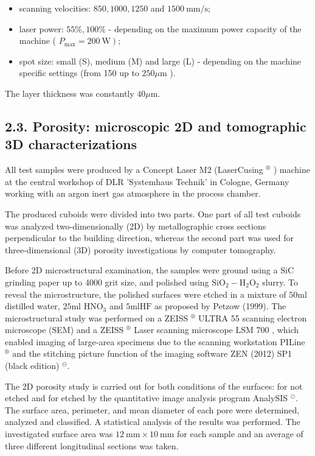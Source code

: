 \documentclass[10pt]{article}
\begin{document}
\begin{itemize}
  \item scanning velocities: $850,1000,1250$ and $1500 \mathrm{~mm} / \mathrm{s}$;

  \item laser power: $55 \%, 100 \%$ - depending on the maximum power capacity of the machine ( $\left.P_{\max }=200 \mathrm{~W}\right)$;

  \item spot size: small (S), medium (M) and large (L) - depending on the machine specific settings (from 150 up to $250 \mu \mathrm{m}$ ).

\end{itemize}

The layer thickness was constantly $40 \mu \mathrm{m}$.

\subsection*{2.3. Porosity: microscopic 2D and tomographic 3D characterizations}
All test samples were produced by a Concept Laser M2 (LaserCusing ${ }^{\circledR}$ ) machine at the central workshop of DLR 'Systemhaus Technik' in Cologne, Germany working with an argon inert gas atmosphere in the process chamber.

The produced cuboids were divided into two parts. One part of all test cuboids was analyzed two-dimensionally (2D) by metallographic cross sections perpendicular to the building direction, whereas the second part was used for three-dimensional (3D) porosity investigations by computer tomography.

Before 2D microstructural examination, the samples were ground using a $\mathrm{SiC}$ grinding paper up to 4000 grit size, and polished using $\mathrm{SiO}_{2}-\mathrm{H}_{2} \mathrm{O}_{2}$ slurry. To reveal the microstructure, the polished surfaces were etched in a mixture of $50 \mathrm{ml}$ distilled water, $25 \mathrm{ml}$ $\mathrm{HNO}_{3}$ and $5 \mathrm{ml} \mathrm{HF}$ as proposed by Petzow (1999). The microstructural study was performed on a ZEISS ${ }^{\circledR}$ ULTRA 55 scanning electron microscope (SEM) and a ZEISS ${ }^{\circledR}$ Laser scanning microscope LSM 700 , which enabled imaging of large-area specimens due to the scanning workstation PILine ${ }^{\circledR}$ and the stitching picture function of the imaging software ZEN (2012) SP1 (black edition) ${ }^{\ominus}$.

The 2D porosity study is carried out for both conditions of the surfaces: for not etched and for etched by the quantitative image analysis program AnalySIS ${ }^{\odot}$. The surface area, perimeter, and mean diameter of each pore were determined, analyzed and classified. A statistical analysis of the results was performed. The investigated surface area was $12 \mathrm{~mm} \times 10 \mathrm{~mm}$ for each sample and an average of three different longitudinal sections was taken.
\end{document}
